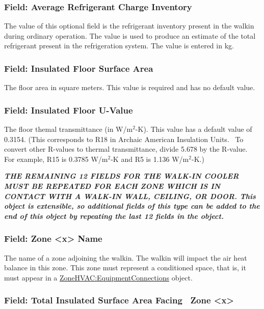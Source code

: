 \subsubsection{Field: Average Refrigerant Charge Inventory}\label{field-average-refrigerant-charge-inventory-1}

The value of this optional field is the refrigerant inventory present in the walkin during ordinary operation. The value is used to produce an estimate of the total refrigerant present in the refrigeration system. The value is entered in kg.

\subsubsection{Field: Insulated Floor Surface Area}\label{field-insulated-floor-surface-area}

The floor area in square meters. This value is required and has no default value.

\subsubsection{Field: Insulated Floor U-Value}\label{field-insulated-floor-u-value}

The floor themal transmittance (in W/m\(^{2}\)-K). This value has a default value of 0.3154. (This corresponds to R18 in Archaic American Insulation Units.~ To convert other R-values to thermal transmittance, divide 5.678 by the R-value.~ For example, R15 is 0.3785 W/m\(^{2}\)-K and R5 is 1.136 W/m\(^{2}\)-K.)

\textbf{\emph{THE REMAINING 12 FIELDS FOR THE WALK-IN COOLER MUST BE REPEATED FOR EACH ZONE WHICH IS IN CONTACT WITH A WALK-IN WALL, CEILING, OR DOOR.  This object is extensible, so additional fields of this type can be added to the end of this object by repeating the last 12 fields in the object.}}

\subsubsection{Field: Zone \textless{}x\textgreater{} Name}\label{field-zone-x-name}

The name of a zone adjoining the walkin. The walkin will impact the air heat balance in this zone. This zone must represent a conditioned space, that is, it must appear in a \hyperref[zonehvacequipmentconnections]{ZoneHVAC:EquipmentConnections} object.

\subsubsection{Field: Total Insulated Surface Area Facing~ Zone \textless{}x\textgreater{}}\label{field-total-insulated-surface-area-facing-zone-x}

